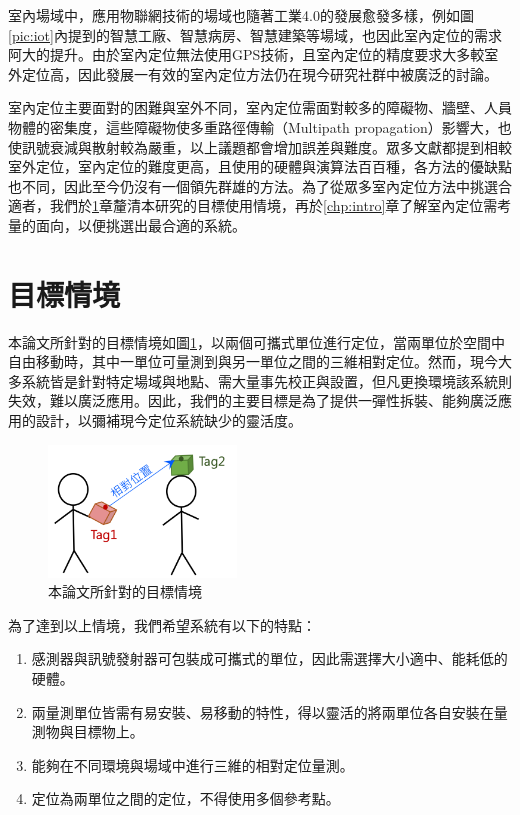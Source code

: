 室內場域中，應用物聯網技術的場域也隨著工業4.0的發展愈發多樣，例如圖\ref{pic:iot}內提到的智慧工廠、智慧病房、智慧建築等場域，也因此室內定位的需求阿大的提升。由於室內定位無法使用GPS技術，且室內定位的精度要求大多較室外定位高，因此發展一有效的室內定位方法仍在現今研究社群中被廣泛的討論\cite{survey_indoor2014}。

室內定位主要面對的困難與室外不同，室內定位需面對較多的障礙物、牆壁、人員物體的密集度，這些障礙物使多重路徑傳輸（Multipath propagation）影響大，也使訊號衰減與散射較為嚴重，以上議題都會增加誤差與難度。眾多文獻都提到相較室外定位，室內定位的難度更高\cite{survey_light2020}\cite{survey_light2018}\cite{survey_indoor2014}\cite{survey_indoor2018}\cite{survey:indoor_wayfinding}，且使用的硬體與演算法百百種，各方法的優缺點也不同，因此至今仍沒有一個領先群雄的方法。為了從眾多室內定位方法中挑選合適者，我們於\ref{chp:motivate}章釐清本研究的目標使用情境，再於\ref{chp:intro}章了解室內定位需考量的面向，以便挑選出最合適的系統。






\section{目標情境}
\label{chp:motivate}

本論文所針對的目標情境如圖\ref{pic:imagine}，以兩個可攜式單位進行定位，當兩單位於空間中自由移動時，其中一單位可量測到與另一單位之間的三維相對定位。然而，現今大多系統皆是針對特定場域與地點、需大量事先校正與設置，但凡更換環境該系統則失效，難以廣泛應用。因此，我們的主要目標是為了提供一彈性拆裝、能夠廣泛應用的設計，以彌補現今定位系統缺少的靈活度。

\begin{figure}[ht]
    \centering
    \includegraphics[width=5cm]{ch1pic/imagine.png}
    \caption{本論文所針對的目標情境}
    \label{pic:imagine}
\end{figure}

為了達到以上情境，我們希望系統有以下的特點：

\begin{enumerate}
    \item 感測器與訊號發射器可包裝成可攜式的單位，因此需選擇大小適中、能耗低的硬體。
    \item 兩量測單位皆需有易安裝、易移動的特性，得以靈活的將兩單位各自安裝在量測物與目標物上。
    \item 能夠在不同環境與場域中進行三維的相對定位量測。
    \item 定位為兩單位之間的定位，不得使用多個參考點。
\end{enumerate}


